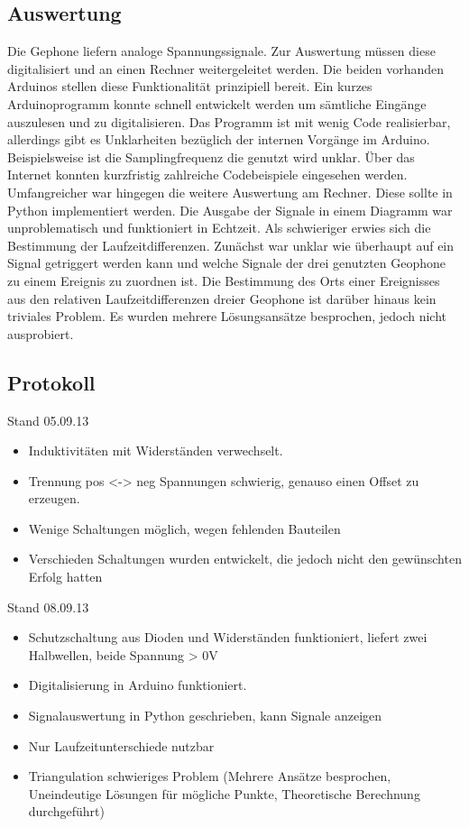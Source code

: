 \subsection{Auswertung}
Die Gephone liefern analoge Spannungssignale. Zur Auswertung müssen diese digitalisiert und an einen Rechner weitergeleitet werden. Die beiden vorhanden Arduinos stellen diese Funktionalität prinzipiell bereit. Ein kurzes Arduinoprogramm konnte schnell entwickelt werden um sämtliche Eingänge auszulesen und zu digitalisieren. Das Programm ist mit wenig Code realisierbar, allerdings gibt es Unklarheiten bezüglich der internen Vorgänge im Arduino. Beispielsweise ist die Samplingfrequenz die genutzt wird unklar. Über das Internet konnten kurzfristig zahlreiche Codebeispiele eingesehen werden. Umfangreicher war hingegen die weitere Auswertung am Rechner. Diese sollte in Python implementiert werden. Die Ausgabe der Signale in einem Diagramm war unproblematisch und funktioniert in Echtzeit. Als schwieriger erwies sich die Bestimmung der Laufzeitdifferenzen. Zunächst war unklar wie überhaupt auf ein Signal getriggert werden kann und welche Signale der drei genutzten Geophone zu einem Ereignis zu zuordnen ist. Die Bestimmung des Orts einer Ereignisses aus den relativen Laufzeitdifferenzen dreier Geophone ist darüber hinaus kein triviales Problem. Es wurden mehrere Lösungsansätze besprochen, jedoch nicht ausprobiert.

\subsection{Protokoll}
Stand 05.09.13
\begin{itemize}
	\item Induktivitäten mit Widerständen verwechselt.
	\item Trennung pos <-> neg Spannungen schwierig, genauso einen Offset zu erzeugen. 
	\item Wenige Schaltungen möglich, wegen fehlenden Bauteilen
	\item Verschieden Schaltungen wurden entwickelt, die jedoch nicht den gewünschten Erfolg hatten
\end{itemize}

Stand 08.09.13
\begin{itemize}
	\item Schutzschaltung aus Dioden und Widerständen funktioniert, liefert zwei Halbwellen, beide Spannung > 0V
	\item Digitalisierung in Arduino funktioniert. 
	\item Signalauswertung in Python geschrieben, kann Signale anzeigen
	\item Nur Laufzeitunterschiede nutzbar
	\item Triangulation schwieriges Problem (Mehrere Ansätze besprochen, Uneindeutige Lösungen für mögliche Punkte, Theoretische Berechnung durchgeführt)
\end{itemize}